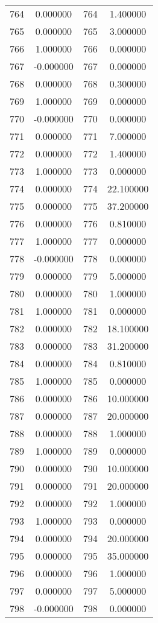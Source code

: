 \documentclass[12pt]{article}
\begin{document}
\begin{longtable}{@{}cccc@{}}
764 & 0.000000 & 764 & 1.400000 \\
765 & 0.000000 & 765 & 3.000000 \\
766 & 1.000000 & 766 & 0.000000 \\
767 & -0.000000 & 767 & 0.000000 \\
768 & 0.000000 & 768 & 0.300000 \\
769 & 1.000000 & 769 & 0.000000 \\
770 & -0.000000 & 770 & 0.000000 \\
771 & 0.000000 & 771 & 7.000000 \\
772 & 0.000000 & 772 & 1.400000 \\
773 & 1.000000 & 773 & 0.000000 \\
774 & 0.000000 & 774 & 22.100000 \\
775 & 0.000000 & 775 & 37.200000 \\
776 & 0.000000 & 776 & 0.810000 \\
777 & 1.000000 & 777 & 0.000000 \\
778 & -0.000000 & 778 & 0.000000 \\
779 & 0.000000 & 779 & 5.000000 \\
780 & 0.000000 & 780 & 1.000000 \\
781 & 1.000000 & 781 & 0.000000 \\
782 & 0.000000 & 782 & 18.100000 \\
783 & 0.000000 & 783 & 31.200000 \\
784 & 0.000000 & 784 & 0.810000 \\
785 & 1.000000 & 785 & 0.000000 \\
786 & 0.000000 & 786 & 10.000000 \\
787 & 0.000000 & 787 & 20.000000 \\
788 & 0.000000 & 788 & 1.000000 \\
789 & 1.000000 & 789 & 0.000000 \\
790 & 0.000000 & 790 & 10.000000 \\
791 & 0.000000 & 791 & 20.000000 \\
792 & 0.000000 & 792 & 1.000000 \\
793 & 1.000000 & 793 & 0.000000 \\
794 & 0.000000 & 794 & 20.000000 \\
795 & 0.000000 & 795 & 35.000000 \\
796 & 0.000000 & 796 & 1.000000 \\
797 & 0.000000 & 797 & 5.000000 \\
798 & -0.000000 & 798 & 0.000000 \\

\end{longtable}
\end{document}
